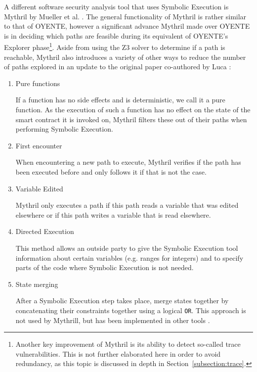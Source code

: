 \documentclass[letterpaper,twocolumn,10pt]{article}
\begin{document}
 A different software security analysis tool that uses Symbolic Execution is Mythril by Mueller et al. \cite{mueller}. The general functionality of Mythril is rather similar to that of OYENTE, however a significant advance Mythril made over OYENTE is in deciding which paths are feasible during its equivalent of OYENTE's Explorer phase\footnote{Another key improvement of Mythril is its ability to detect so-called trace vulnerabilities. This is not further elaborated here in order to avoid redundancy, as this topic is discussed in depth in Section~\ref{subsection:trace}.}. Aside from using the Z3 solver to determine if a path is reachable, Mythril also introduces a variety of other ways to reduce the number of paths explored in an update to the original paper co-authored by Luca \cite{mueller_luca_2019}:

\begin{enumerate}
	\item Pure functions

	If a function has no side effects and is deterministic, we call it a pure function. As the execution of such a function has no effect on the state of the smart contract it is invoked on, Mythril filters these out of their paths when performing Symbolic Execution.

	\item First encounter


	When encountering a new path to execute, Mythril verifies if the path has been executed before and only follows it if that is not the case.

	\item Variable Edited

	Mythril only executes a path if this path reads a variable that was edited elsewhere or if this path writes a variable that is read elsewhere.

	\item Directed Execution

	This method allows an outside party to give the Symbolic Execution tool information about certain variables (e.g. ranges for integers) and to specify parts of the code where Symbolic Execution is not needed.

	\item State merging

	After a Symbolic Execution step takes place, merge states together by concatenating their constraints together using a logical \verb|OR|. This approach is not used by Mythrill, but has been implemented in other tools \cite{mossberg_manzano_hennenfent_groce_grieco_feist_brunson_dinaburg_2019}.


\end{enumerate}
\end{document}
